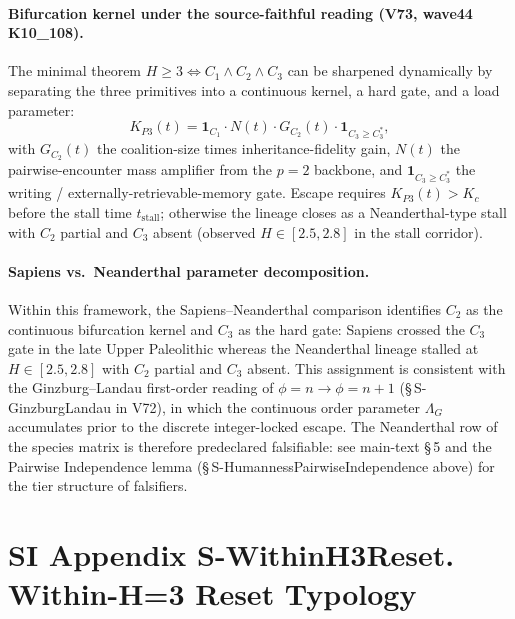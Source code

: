 \documentclass[11pt]{article}
\begin{document}
\paragraph{Bifurcation kernel under the source-faithful reading (V73, wave44 K10\_108).} The minimal theorem $H\!\ge\!3\Leftrightarrow C_1\wedge C_2\wedge C_3$ can be sharpened dynamically by separating the three primitives into a continuous kernel, a hard gate, and a load parameter:
\[
K_{P3}(t)=\mathbf{1}_{C_1}\cdot N(t)\cdot G_{C_2}(t)\cdot\mathbf{1}_{C_3\ge C_3^{\ast}},
\]
with $G_{C_2}(t)$ the coalition-size times inheritance-fidelity gain, $N(t)$ the pairwise-encounter mass amplifier from the $p{=}2$ backbone, and $\mathbf{1}_{C_3\ge C_3^{\ast}}$ the writing / externally-retrievable-memory gate. Escape requires $K_{P3}(t)>K_c$ before the stall time $t_{\mathrm{stall}}$; otherwise the lineage closes as a Neanderthal-type stall with $C_2$ partial and $C_3$ absent (observed $H\in[2.5,2.8]$ in the stall corridor).

\paragraph{Sapiens vs.\ Neanderthal parameter decomposition.} Within this framework, the Sapiens--Neanderthal comparison identifies $C_2$ as the continuous bifurcation kernel and $C_3$ as the hard gate: Sapiens crossed the $C_3$ gate in the late Upper Paleolithic whereas the Neanderthal lineage stalled at $H\in[2.5,2.8]$ with $C_2$ partial and $C_3$ absent. This assignment is consistent with the Ginzburg--Landau first-order reading of $\phi{=}n\to\phi{=}n{+}1$ (\S\,S-GinzburgLandau in V72), in which the continuous order parameter $\Lambda_G$ accumulates prior to the discrete integer-locked escape. The Neanderthal row of the species matrix is therefore predeclared falsifiable: see main-text \S\,5 and the Pairwise Independence lemma (\S\,S-HumannessPairwiseIndependence above) for the tier structure of falsifiers.

\section*{SI Appendix S-WithinH3Reset. Within-H=3 Reset Typology}
\label{sec:S-WithinH3Reset}
\end{document}
